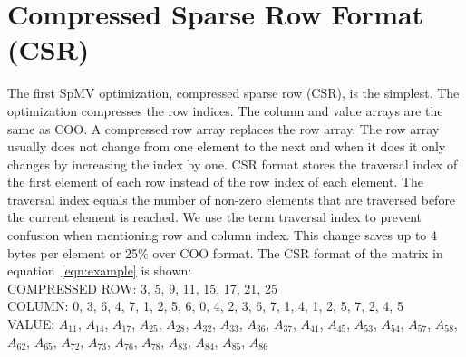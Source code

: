 \section{Compressed Sparse Row Format (CSR)}
The first SpMV optimization, compressed sparse row (CSR), is the simplest. The optimization compresses the row indices. The column and value arrays are the same as COO. A compressed row array replaces the row array. The row array usually does not change from one element to the next and when it does it only changes by increasing the index by one. CSR format stores the traversal index of the first element of each row instead of the row index of each element. The traversal index equals the number of non-zero elements that are traversed before the current element is reached. We use the term traversal index to prevent confusion when mentioning row and column index. This change saves up to 4 bytes per element or 25\% over COO format. The CSR format of the matrix in equation~\ref{eqn:example} is shown: \\
COMPRESSED ROW: 3, 5, 9, 11, 15, 17, 21, 25 \\
COLUMN: 0, 3, 6, 4, 7, 1, 2, 5, 6, 0, 4, 2, 3, 6, 7, 1, 4, 1, 2, 5, 7, 2, 4, 5\\ 
VALUE: $A_{11}$, $A_{14}$, $A_{17}$, $A_{25}$, $A_{28}$, $A_{32}$, $A_{33}$, $A_{36}$, $A_{37}$, $A_{41}$, $A_{45}$, $A_{53}$, $A_{54}$, $A_{57}$, $A_{58}$, $A_{62}$, $A_{65}$, $A_{72}$, $A_{73}$, $A_{76}$, $A_{78}$, $A_{83}$, $A_{84}$, $A_{85}$, $A_{86}$ \par
